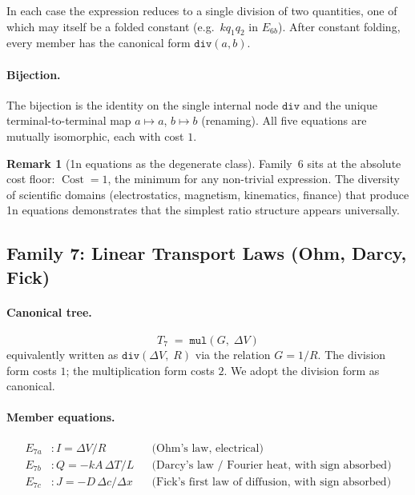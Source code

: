 \documentclass[12pt,a4paper]{article}
\theoremstyle{definition}
\newtheorem{remark}[theorem]{Remark}
\newcommand{\Cost}{\operatorname{Cost}}
\newcommand{\mmul}{\mathtt{mul}}
\newcommand{\mdiv}{\mathtt{div}}
\begin{document}
In each case the expression reduces to a single division of two quantities, one
of which may itself be a folded constant (e.g.\ $kq_1q_2$ in $E_{6b}$).
After constant folding, every member has the canonical form $\mdiv(a, b)$.

\paragraph{Bijection.}
The bijection is the identity on the single internal node $\mdiv$ and the
unique terminal-to-terminal map $a \mapsto a$, $b \mapsto b$ (renaming).
All five equations are mutually isomorphic, each with cost $1$.

\begin{remark}[1n equations as the degenerate class]
Family~6 sits at the absolute cost floor: $\Cost = 1$, the minimum for any
non-trivial expression.  The diversity of scientific domains (electrostatics,
magnetism, kinematics, finance) that produce 1n equations demonstrates that
the simplest ratio structure appears universally.
\end{remark}

\subsection{Family 7: Linear Transport Laws (Ohm, Darcy, Fick)}
\label{sec:fam7}

\paragraph{Canonical tree.}
\[
  T_7 \;=\; \mmul(G,\; \Delta V)
\]
equivalently written as $\mdiv(\Delta V,\; R)$ via the relation $G = 1/R$.
The division form costs $1$; the multiplication form costs $2$.  We adopt the
division form as canonical.

\paragraph{Member equations.}
\begin{align*}
  E_{7a} &: I = \Delta V / R
            && \text{(Ohm's law, electrical)} \\
  E_{7b} &: Q = -kA\,\Delta T / L
            && \text{(Darcy's law / Fourier heat, with sign absorbed)}\\
  E_{7c} &: J = -D\,\Delta c / \Delta x
            && \text{(Fick's first law of diffusion, with sign absorbed)}
\end{align*}
\end{document}

